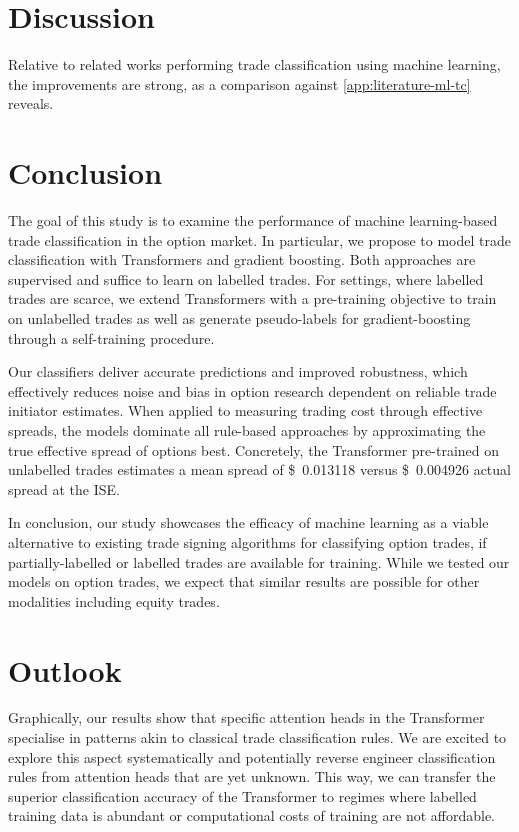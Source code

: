 \section{Discussion}\label{sec:discussion}

Relative to related works performing trade classification using machine learning, the improvements are strong, as a comparison against \cref{app:literature-ml-tc} reveals.

\newpage
\section{Conclusion}\label{sec:conclusion}

The goal of this study is to examine the performance of machine learning-based trade classification in the option market. In particular, we propose to model trade classification with Transformers and gradient boosting. Both approaches are supervised and suffice to learn on labelled trades. For settings, where labelled trades are scarce, we extend Transformers with a pre-training objective to train on unlabelled trades as well as generate pseudo-labels for gradient-boosting through a self-training procedure.

Our classifiers deliver accurate predictions and improved robustness, which effectively reduces noise and bias in option research dependent on reliable trade initiator estimates. When applied to measuring trading cost through effective spreads, the models dominate all rule-based approaches by approximating the true effective spread of options best. Concretely, the Transformer pre-trained on unlabelled trades estimates a mean spread of  \SI[round-mode=places, round-precision=3]{0.013118}[\$]{} versus \SI[round-mode=places, round-precision=3]{0.004926}[\$]{} actual spread at the \gls{ISE}.

In conclusion, our study showcases the efficacy of machine learning as a viable alternative to existing trade signing algorithms for classifying option trades, if partially-labelled or labelled trades are available for training. While we tested our models on option trades, we expect that similar results are possible for other modalities including equity trades. 

\newpage
\section{Outlook}\label{sec:outlook}

Graphically, our results show that specific attention heads in the Transformer specialise in patterns akin to classical trade classification rules. We are excited to explore this aspect systematically and potentially reverse engineer classification rules from attention heads that are yet unknown. This way, we can transfer the superior classification accuracy of the Transformer to regimes where labelled training data is abundant or computational costs of training are not affordable.
